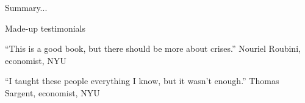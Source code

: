 
Summary... 


Made-up testimonials 

``This is a good book, but there should be more about crises.''
Nouriel Roubini, economist, NYU

``I taught these people everything I know, but it wasn't enough.''
Thomas Sargent, economist, NYU







